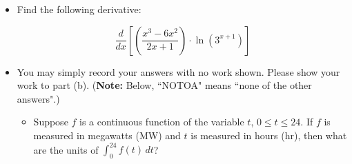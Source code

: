 \documentclass[11pt]{article}
\begin{document}
\begin{itemize}
        \begin{center}
            \begin{tabular}{l c r l c r}
                $\displaystyle\frac{d}{dx}\left[ -4x^{9} \right]$ & $=$ & \rule[-8pt]{1.5in}{0.4pt} &
                \vspace{4cm}
                $\displaystyle\frac{d}{dx}\left[ \dfrac{2}{\sqrt{x^3}} \right]$ & $=$ & \rule[-8pt]{1.5in}{0.4pt}\\[0.3in]
                \vspace{4cm}
                $\displaystyle\frac{d}{dx}\left[ 4^x \right]$ & $=$ & \rule[-8pt]{1.5in}{0.4pt} & 
                $\displaystyle\frac{d}{dx}\left[ \frac{\pi^2}{6} \right]$ & $=$ & \rule[-8pt]{1.5in}{0.4pt}\\[0.3in]
                \vspace{4cm}
                $\displaystyle\frac{d}{dx}\left[ x^2 + x+1 \right]$ & $=$ & \rule[-8pt]{1.5in}{0.4pt}&
                $\displaystyle\frac{d}{dx}\left[ \ln(x) + x \right]$ & $=$ & \rule[-8pt]{1.5in}{0.4pt}\\[0.3in]
                \vspace{3cm}
                $\displaystyle\frac{d}{dx}\left[ \log_2(x^5) \right]$ & $=$ & \rule[-8pt]{1.5in}{0.4pt} & 
                $\displaystyle\frac{d}{dx}\left[ \frac{1}{x} + \frac{2}{x^2} \right]$ & $=$ & \rule[-8pt]{1.5in}{0.4pt}\\[0.3in]
            \end{tabular}

        \end{center}        \pagebreak

    \item[\textbf{D3.}]Find the following derivative:

        \[ \dfrac{d}{dx} \left[ \left( \dfrac{x^3-6x^2}{2x+1} \right) \cdot \ln(3^{x+1}) \right]\]
        \pagebreak

    \item[\textbf{I1.}] You may simply record your answers with no work shown. Please show your work to part (b). ({\bf Note:} Below, ``NOTOA" means ``none of the other answers".)
        \begin{itemize}

            \item[(a)] Suppose $f$ is a continuous function of the variable $t$, $0\leq t\leq 24$. If $f$ is measured in megawatts (MW) and $t$ is measured in hours (hr), then what are the units of $\displaystyle\int_0^{24} f(t)\,dt$?\\


\end{itemize}
\end{itemize}
\end{document}
